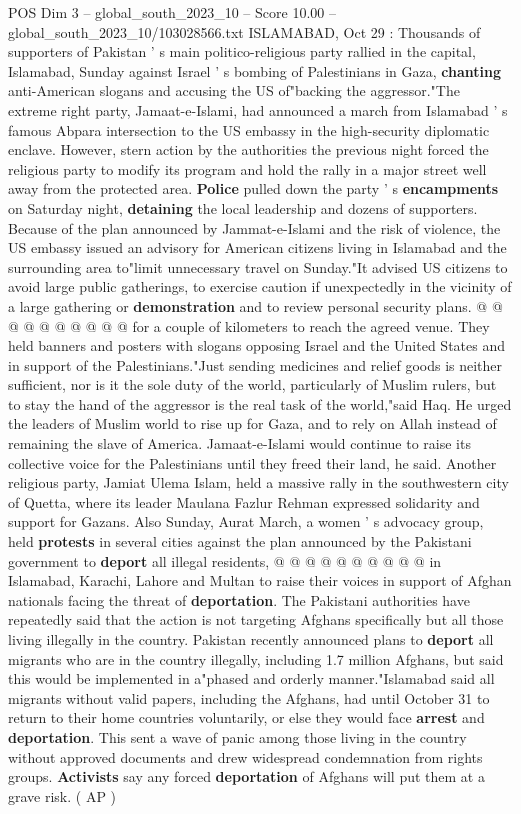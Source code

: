 \begin{textsample}{POS Dim 3 – global\_south\_2023\_10 – Score 10.00 – global\_south\_2023\_10/103028566.txt}  \label{ex:f3_pos_435}
ISLAMABAD, Oct 29 : Thousands of supporters of Pakistan ' s main politico-religious party rallied in the capital, Islamabad, Sunday against Israel ' s bombing of Palestinians in Gaza, \textbf{chanting} anti-American slogans and accusing the US of"backing the aggressor."The extreme right party, Jamaat-e-Islami, had announced a march from Islamabad ' s famous Abpara intersection to the US embassy in the high-security diplomatic enclave.
However, stern action by the authorities the previous night forced the religious party to modify its program and hold the rally in a major street well away from the protected area. \textbf{Police} pulled down the party ' s \textbf{encampments} on Saturday night, \textbf{detaining} the local leadership and dozens of supporters.
Because of the plan announced by Jammat-e-Islami and the risk of violence, the US embassy issued an advisory for American citizens living in Islamabad and the surrounding area to"limit unnecessary travel on Sunday."It advised US citizens to avoid large public gatherings, to exercise caution if unexpectedly in the vicinity of a large gathering or \textbf{demonstration} and to review personal security plans. @ @ @ @ @ @ @ @ @ @ for a couple of kilometers to reach the agreed venue.
They held banners and posters with slogans opposing Israel and the United States and in support of the Palestinians."Just sending medicines and relief goods is neither sufficient, nor is it the sole duty of the world, particularly of Muslim rulers, but to stay the hand of the aggressor is the real task of the world,"said Haq.
He urged the leaders of Muslim world to rise up for Gaza, and to rely on Allah instead of remaining the slave of America.
Jamaat-e-Islami would continue to raise its collective voice for the Palestinians until they freed their land, he said.
Another religious party, Jamiat Ulema Islam, held a massive rally in the southwestern city of Quetta, where its leader Maulana Fazlur Rehman expressed solidarity and support for Gazans.
Also Sunday, Aurat March, a women ' s advocacy group, held \textbf{protests} in several cities against the plan announced by the Pakistani government to \textbf{deport} all illegal residents, @ @ @ @ @ @ @ @ @ @ in Islamabad, Karachi, Lahore and Multan to raise their voices in support of Afghan nationals facing the threat of \textbf{deportation}.
The Pakistani authorities have repeatedly said that the action is not targeting Afghans specifically but all those living illegally in the country.
Pakistan recently announced plans to \textbf{deport} all migrants who are in the country illegally, including 1.7 million Afghans, but said this would be implemented in a"phased and orderly manner."Islamabad said all migrants without valid papers, including the Afghans, had until October 31 to return to their home countries voluntarily, or else they would face \textbf{arrest} and \textbf{deportation}.
This sent a wave of panic among those living in the country without approved documents and drew widespread condemnation from rights groups. \textbf{Activists} say any forced \textbf{deportation} of Afghans will put them at a grave risk. ( AP )


\end{textsample}
